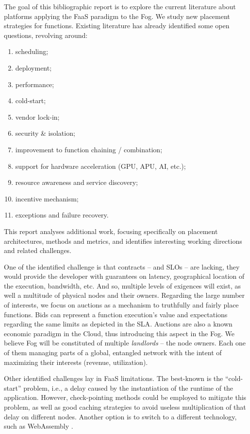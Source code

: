 \documentclass[11pt]{sdm}
\begin{document}
The goal of this bibliographic report is to explore the current literature about platforms applying the \gls{FaaS} paradigm to the Fog. We study new placement strategies for functions. Existing literature \cite{kjorveziroski_iot_2021,xie_when_2021} has already identified some open questions, revolving around:
\begin{enumerate}[(1)]
	\item scheduling;
	\item deployment;
	\item performance;
	\item cold-start;
	\item vendor lock-in;
	\item security \& isolation;
	\item improvement to function chaining / combination;
	\item support for hardware acceleration (\gls{GPU}, \gls{APU}, \gls{AI}, etc.);
	\item resource awareness and service discovery;
	\item incentive mechanism;
	\item exceptions and failure recovery.
\end{enumerate}
This report analyses additional work, focusing specifically on placement architectures, methods and metrics, and identifies interesting working directions and related challenges.

One of the identified challenge is that contracts --  and \glspl{SLO} -- are lacking, they would provide the developer with guarantees on latency, geographical location of the execution, bandwidth, etc. And so, multiple levels of exigences will exist, as well a multitude of physical nodes and their owners. Regarding the large number of interests, we focus on auctions as a mechanism to truthfully and fairly place functions. Bids can represent a function execution's value and expectations regarding the same limits as depicted in the \gls{SLA}. Auctions are also a known economic paradigm in the Cloud, thus introducing this aspect in the Fog. We believe Fog will be constituted of multiple \emph{landlords} -- the node owners. Each one of them managing parts of a global, entangled network with the intent of maximizing their interests (revenue, utilization).

Other identified challenges lay in \gls{FaaS} limitations. The best-known is the ``cold-start'' problem, i.e., a delay caused by the instantiation of the runtime of the application. However, check-pointing methods could be employed to mitigate this problem, as well as good caching strategies to avoid useless multiplication of that delay on different nodes. Another option is to switch to a different technology, such as WebAssembly \cite{hykes_solomon_2019}.
\end{document}
